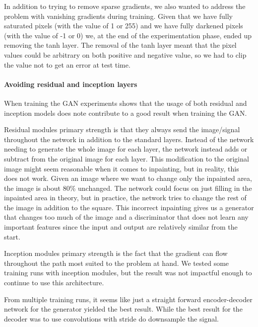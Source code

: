 In addition to trying to remove sparse gradients, we also wanted to address the problem with vanishing gradients during training. Given that we have fully saturated pixels (with the value of 1 or 255) and we have fully darkened pixels (with the value of -1 or 0) we, at the end of the experimentation phase, ended up removing the tanh layer. 
The removal of the tanh layer meant that the pixel values could be arbitrary on both positive and negative value, so we had to clip the value not to get an error at test time. 



\paragraph{Avoiding residual and inception layers}
When training the GAN experiments shows that the usage of both residual \cite{Rumelhart:1986:LIR:104279.104293} and inception \cite{DBLP:journals/corr/SzegedyLJSRAEVR14} models does note contribute to a good result when training the GAN.

Residual modules primary strength is that they always send the image/signal throughout the network in addition to the standard layers. Instead of the network needing to generate the whole image for each layer, the network instead adds or subtract from the original image for each layer.
This modification to the original image might seem reasonable when it comes to inpainting, but in reality, this does not work.  Given an image where we want to change only the inpainted area, the image is about 80\% unchanged. The network could focus on just filling in the inpainted area in theory, but in practice, the network tries to change the rest of the image in addition to the square. This incorrect inpainting gives us a generator that changes too much of the image and a discriminator that does not learn any important features since the input and output are relatively similar from the start.

Inception modules primary strength is the fact that the gradient can flow throughout the path most suited to the problem at hand.
We tested some training runs with inception modules, but the result was not impactful enough to continue to use this architecture.

From multiple training runs, it seems like just a straight forward encoder-decoder network for the generator yielded the best result. While the best result for the decoder was to use convolutions with stride do downsample the signal.

